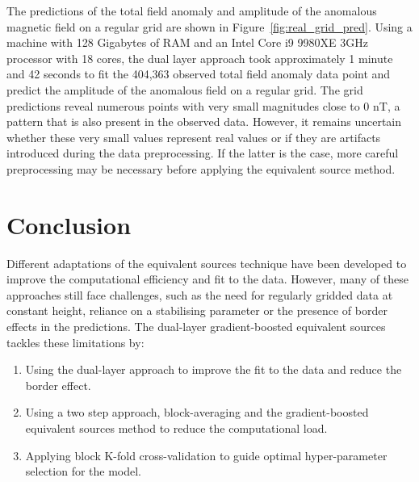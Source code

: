 The predictions of the total field anomaly and amplitude of the anomalous magnetic field on a regular grid are shown in Figure~\ref{fig:real_grid_pred}. Using a machine with 128 Gigabytes of RAM and an Intel Core i9 9980XE 3GHz processor with 18 cores, the dual layer approach took approximately 1 minute and 42 seconds to fit the 404,363 observed total field anomaly data point and predict the amplitude of the anomalous field on a regular grid. The grid predictions reveal numerous points with very small magnitudes close to 0 nT, a pattern that is also present in the observed data. However, it remains uncertain whether these very small values represent real values or if they are artifacts introduced during the data preprocessing. If the latter is the case, more careful preprocessing may be necessary before applying the equivalent source method.



\section{Conclusion}

Different adaptations of the equivalent sources technique have been developed to improve the computational efficiency and fit to the data. However, many of these approaches still face challenges, such as the need for regularly gridded data at constant height, reliance on a stabilising parameter or the presence of border effects in the predictions. The dual-layer gradient-boosted equivalent sources tackles these limitations by:

\begin{enumerate}
    \item Using the dual-layer approach to improve the fit to the data and reduce the border effect.
    \item Using a two step approach, block-averaging and the gradient-boosted equivalent sources method to reduce the computational load.
    \item Applying block K-fold cross-validation to guide optimal hyper-parameter selection for the model.
\end{enumerate}

